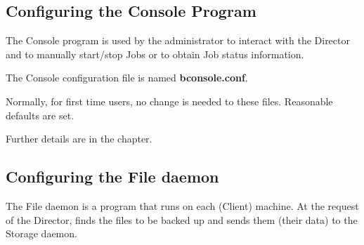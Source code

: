 \subsection{Configuring the Console Program}


The Console program is used by the administrator to interact with the Director
and to manually start/stop Jobs or to obtain Job status information.

The Console configuration file is named {\bf bconsole.conf}.

Normally, for first time users, no change is needed to these files. Reasonable
defaults are set.

Further details are in the
 chapter.

% 
% 
% 
% 
% 

\subsection{Configuring the File daemon}

The File daemon is a program that runs on each (Client) machine. At the
request of the Director, finds the files to be backed up and sends them (their
data) to the Storage daemon.

